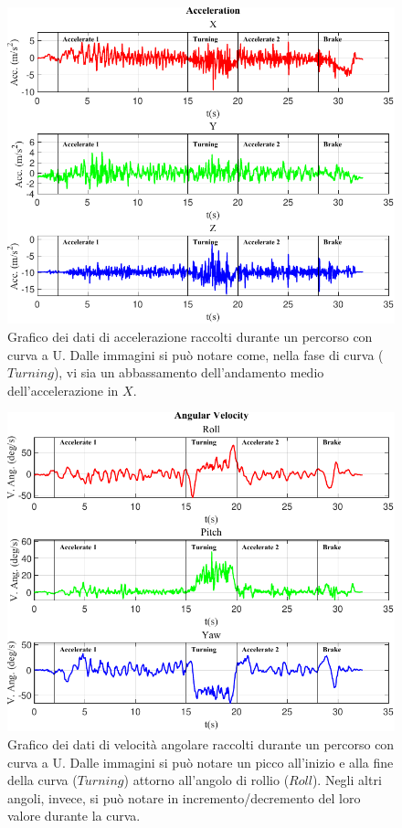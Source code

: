 \documentclass[class=article]{standalone}
\begin{document}
	\begin{center}
		\begin{figure}[h]
			\centering\includegraphics[width=.9\textwidth]{img/Acc CurvaUF.pdf}
			\caption[]{Grafico dei dati di accelerazione raccolti durante un percorso con curva a U. Dalle immagini si può notare come, nella fase di curva (\(Turning\)), vi sia un abbassamento dell'andamento medio dell'accelerazione in \(X\).}
			\label{fig:AccCurvaU}
		\end{figure}
		
		\begin{figure}[h]
			\centering\includegraphics[width=.9\textwidth]{img/VAng CurvaUF.pdf}
			\caption[]{Grafico dei dati di velocità angolare raccolti durante un percorso con curva a U. Dalle immagini si può notare un picco all'inizio e alla fine della curva (\(Turning\)) attorno all'angolo di rollio (\(Roll\)). Negli altri angoli, invece, si può notare in incremento/decremento del loro valore durante la curva.}
			\label{fig:VAngCurvaU}
		\end{figure}
		

\end{center}
\end{document}
